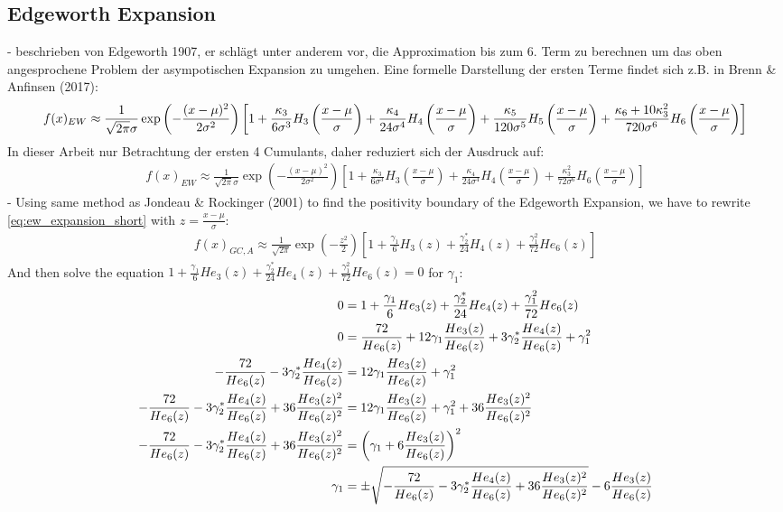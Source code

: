 \subsection{Edgeworth Expansion}
- beschrieben von Edgeworth 1907, er schlägt unter anderem vor, die Approximation bis zum 6. Term zu berechnen um das oben angesprochene Problem der asympotischen Expansion zu umgehen. Eine formelle Darstellung der ersten Terme findet sich z.B. in Brenn & Anfinsen (2017):
\begin{align}
    f(x)_{EW} \approx \frac{1}{\sqrt{2\pi}\sigma}\exp\left(-\frac{(x-\mu)^2}{2\sigma^2}\right) \left[1 + \frac{\kappa_3}{6\sigma^3}H_3\left(\frac{x-\mu}{\sigma}\right) + \frac{\kappa_4}{24\sigma^4}H_4\left(\frac{x-\mu}{\sigma}\right) + \frac{\kappa_5}{120\sigma^5}H_5\left(\frac{x-\mu}{\sigma}\right) + \frac{\kappa_6 + 10\kappa_3^2}{720\sigma^6}H_6\left(\frac{x-\mu}{\sigma}\right)\right] \notag
\end{align}
In dieser Arbeit nur Betrachtung der ersten 4 Cumulants, daher reduziert sich der Ausdruck auf:
\begin{align}
    \label{eq:ew_expansion_short}
    f(x)_{EW} \approx \frac{1}{\sqrt{2\pi}\sigma}\exp\left(-\frac{(x-\mu)^2}{2\sigma^2}\right) \left[1 + \frac{\kappa_3}{6\sigma^3}H_3\left(\frac{x-\mu}{\sigma}\right) + \frac{\kappa_4}{24\sigma^4}H_4\left(\frac{x-\mu}{\sigma}\right) + \frac{\kappa_3^2}{72\sigma^6}H_6\left(\frac{x-\mu}{\sigma}\right)\right]
\end{align}
- Using same method as Jondeau & Rockinger (2001) to find the positivity boundary of the Edgeworth Expansion, we have to rewrite \eqref{eq:ew_expansion_short} with $z = \frac{x-\mu}{\sigma}$:
\begin{align}
    \label{eq:ew_expansion_s_ek}
    f(x)_{GC,A} \approx \frac{1}{\sqrt{2\pi}}\exp\left(-\frac{z^2}{2}\right) \left[1 + \frac{\gamma_1}{6}H_3(z) + \frac{\gamma_2^*}{24}H_4(z) + \frac{\gamma_1^2}{72}He_6(z)\right]
\end{align}
And then solve the equation $1 + \frac{\gamma_1}{6}He_3(z) + \frac{\gamma_2^*}{24}He_4(z) + \frac{\gamma_1^2}{72}He_6(z)=0$ for $\gamma_1$:
\begin{align}
    0 &= 1+\frac{\gamma_1}{6}He_3(z) + \frac{\gamma_2^*}{24}He_4(z) + \frac{\gamma_1^2}{72}He_6(z) \\
    0 &= \frac{72}{He_6(z)} + 12\gamma_1\frac{He_3(z)}{He_6(z)} + 3\gamma_2^*\frac{He_4(z)}{He_6(z)} + \gamma_1^2 \notag \\
    -\frac{72}{He_6(z)} - 3\gamma_2^*\frac{He_4(z)}{He_6(z)} &=  12\gamma_1\frac{He_3(z)}{He_6(z)} + \gamma_1^2 \notag \\
    -\frac{72}{He_6(z)} - 3\gamma_2^*\frac{He_4(z)}{He_6(z)} + 36\frac{He_3(z)^2}{He_6(z)^2} &= 12\gamma_1\frac{He_3(z)}{He_6(z)} + \gamma_1^2 + 36\frac{He_3(z)^2}{He_6(z)^2} \notag \\
    -\frac{72}{He_6(z)} - 3\gamma_2^*\frac{He_4(z)}{He_6(z)} + 36\frac{He_3(z)^2}{He_6(z)^2} &= \left(\gamma_1+6\frac{He_3(z)}{He_6(z)}\right)^2 \notag \\
    \gamma_1 &= \pm\sqrt{-\frac{72}{He_6(z)} - 3\gamma_2^*\frac{He_4(z)}{He_6(z)} + 36\frac{He_3(z)^2}{He_6(z)^2}} - 6\frac{He_3(z)}{He_6(z)} \notag
\end{align} %
